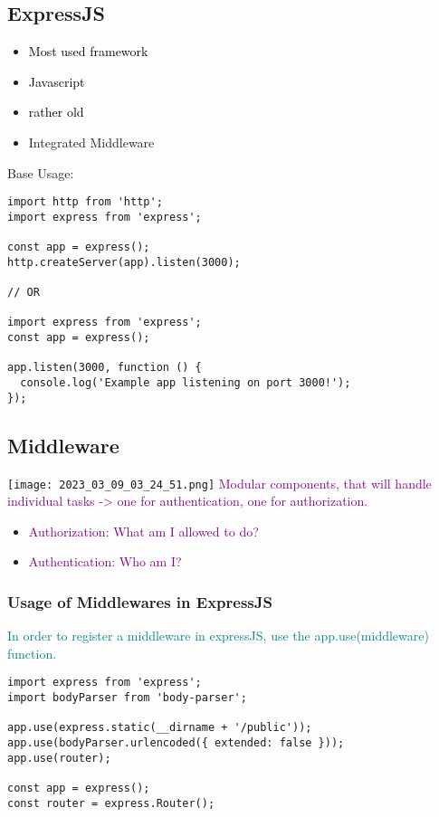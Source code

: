 \documentclass[main.tex,fontsize=8pt,paper=a4,paper=portrait,DIV=calc,]{scrartcl}
\begin{document}
\subsection{ExpressJS}
\begin{itemize}
\item \textcolor{black}{Most used framework}
\item \textcolor{black}{Javascript}
\item \textcolor{black}{rather old}
\item Integrated Middleware
\end{itemize} 
Base Usage: 
\begin{lstlisting}
import http from 'http';
import express from 'express';

const app = express();
http.createServer(app).listen(3000);

// OR 

import express from 'express';
const app = express();

app.listen(3000, function () {
  console.log('Example app listening on port 3000!');
});
\end{lstlisting}

\subsection{Middleware}
\texttt{[image: 2023\_03\_09\_03\_24\_51.png]}\newline
\textcolor{purple}{Modular components, that will handle individual tasks -> one for authentication, one for authorization.}\newline
\begin{itemize}
\item \textcolor{purple}{Authorization: What am I allowed to do?}
\item \textcolor{purple}{Authentication: Who am I?}
\end{itemize} 

\subsubsection{Usage of Middlewares in ExpressJS}
\textcolor{teal}{In order to register a middleware in expressJS, use the app.use(middleware) function.}
\begin{lstlisting}
import express from 'express';
import bodyParser from 'body-parser';

app.use(express.static(__dirname + '/public'));
app.use(bodyParser.urlencoded({ extended: false }));
app.use(router);

const app = express();
const router = express.Router();
\end{lstlisting}
\end{document}
